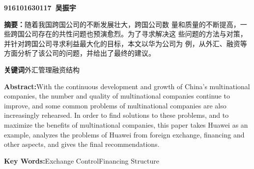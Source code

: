\documentclass[twoside, openright]{report}
\numberwithin{Exercise}{chapter}
\numberwithin{Answer}{chapter}
\begin{document}

\pagestyle{fancy}
\renewcommand{\headrulewidth}{0pt}
\fancyhead[LC, RC]{}
\fancyhead[LE, RO]{}
\fancyhead[RE, LO]{}
\fancyfoot[LC, RC]{}
\fancyfoot[LE, RO]{}
\fancyfoot[RE, LO]{}


\newpage

\begin{center}

	\vspace{20pt}

	\heiti{}\textbf{\Title}

	\vspace{20pt}

	\kaishu{}\textbf{916101630117~吴振宇}

\end{center}

\vspace{2em}

{

	\setlength{\baselineskip}{18pt}
	\kaishu

	\noindent

	\textbf{摘要：}\hspace{\ccwd}随着我国跨国公司的不断发展壮大，跨国公司数
	量和质量的不断提高，一些跨国公司存在的共性问题也预演愈烈。为了寻求解决这
	些问题的方法与对策，并针对跨国公司寻求利益最大化的目标，本文以华为公司为
	例，从外汇、融资等方面分析了该公司的问题，并给出了最终的建议。
	\cite{王建英2003国际财务管理学,宋常2001国际财务管理的整体构架,王化成1996国际财务管理目标研究}

	\textbf{关键词}\hspace{\ccwd}外汇管理\hspace{\ccwd}融资结构

	\noindent

	\textbf{Abstract:}\hspace{1em}With the continuous development and growth
	of China's multinational companies, the number and quality of
	multinational companies continue to improve, and some common problems of
	multinational companies are also increasingly rehearsed. In order to
	find solutions to these problems, and to maximize the benefits of
	multinational companies, this paper takes Huawei as an example, analyzes
	the problems of Huawei from foreign exchange, financing and other
	aspects, and gives the final recommendations.

	\textbf{Key Words:}\hspace{1em}Exchange Control\hspace{1em}Financing
	Structure

}
\end{document}
